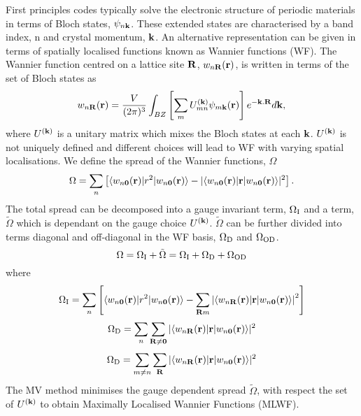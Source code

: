 First principles codes typically solve the electronic structure of
periodic materials in terms of Bloch states, $\psi_{n{\bf k}}$. 
These extended states are characterised by a band index, n and crystal
momentum, ${\bf k}$. An alternative representation can be given in terms
of spatially localised functions known as Wannier functions (WF). The Wannier function 
centred on a lattice site ${\bf R}$,  $w_{n{\bf R}}({\bf r})$, 
is written in terms of the set of Bloch states as
\begin{equation}
w_{n{\bf R}}({\bf r})=\frac{V}{(2\pi)^3}\int_{BZ} \left[\sum_{m} U^{({\bf
k})}_{mn} \psi_{m{\bf k}}({\bf r})\right]e^{-{\bf k}.{\bf R}} d{\bf k},
\end{equation}
where $U^{({\bf k})}$ is a unitary matrix which mixes the Bloch states at each
${\bf k}$. $U^{({\bf k})}$ is not uniquely defined and different choices
will lead to WF with varying spatial localisations. We define the spread
of the Wannier functions, $\Omega$ 
\begin{equation}
\Omega=\sum_n \left[\langle w_{n{\bf 0}}({\bf r})| r^2 | w_{n{\bf
      0}}({\bf r}) \rangle - | \langle w_{n{\bf 0}}({\bf r})| {\bf r} | w_{n{\bf
      0}}({\bf r}) \rangle |^2 \right].
\end{equation}
The total spread can be decomposed into a gauge invariant term,
$\Omega_{\rm I}$ and a term, ${\tilde \Omega}$ which is dependant on the gauge
choice $U^{({\bf k})}$. ${\tilde \Omega}$ can
be further divided into terms diagonal and off-diagonal in the WF basis,
$\Omega_{\rm D}$ and $\Omega_{\rm OD}$.
\begin{equation}
\Omega=\Omega_{\rm I}+{\tilde \Omega}=\Omega_{\rm I}+\Omega_{\rm D}+\Omega_{\rm OD}
\end{equation}
where
\begin{equation}
\Omega_{{\rm I}}=\sum_n \left[\langle w_{n{\bf 0}}({\bf r})| r^2 | w_{n{\bf
      0}}({\bf r}) \rangle - \sum_{{\bf R}m} \left| \langle w_{n{\bf R}}({\bf r})| {\bf r} | w_{n{\bf
      0}}({\bf r}) \rangle \right| ^2 \right]
\end{equation}
\begin{equation}
\Omega_{\rm D}=\sum_n \sum_{{\bf R}\neq{\bf 0}} |\langle w_{n{\bf R}}({\bf r})| {\bf r} |
w_{n{\bf 0}}({\bf r}) \rangle|^2 
\end{equation}
\begin{equation}
\Omega_{\rm D}=\sum_{m\neq n} \sum_{{\bf R}} |\langle w_{n{\bf R}}({\bf
  r})| {\bf r} |
w_{n{\bf 0}}({\bf r}) \rangle |^2 
\end{equation}
The MV method minimises the gauge dependent spread $\tilde{\Omega}$, with respect the set
of $U^{({\bf k})}$ to obtain Maximally Localised Wannier Functions (MLWF).

